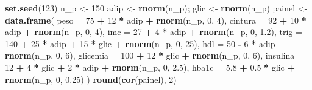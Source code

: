 \documentclass[
]{book}
\newenvironment{Shaded}{\begin{snugshade}}{\end{snugshade}}
\newcommand{\AttributeTok}[1]{\textcolor[rgb]{0.13,0.29,0.53}{#1}}
\newcommand{\DecValTok}[1]{\textcolor[rgb]{0.00,0.00,0.81}{#1}}
\newcommand{\FloatTok}[1]{\textcolor[rgb]{0.00,0.00,0.81}{#1}}
\newcommand{\FunctionTok}[1]{\textcolor[rgb]{0.13,0.29,0.53}{\textbf{#1}}}
\newcommand{\NormalTok}[1]{#1}
\newcommand{\OtherTok}[1]{\textcolor[rgb]{0.56,0.35,0.01}{#1}}
\newcommand{\SpecialCharTok}[1]{\textcolor[rgb]{0.81,0.36,0.00}{\textbf{#1}}}
\begin{document}
\begin{Shaded}
\begin{Highlighting}[]
\FunctionTok{set.seed}\NormalTok{(}\DecValTok{123}\NormalTok{)}
\NormalTok{n\_p }\OtherTok{\textless{}{-}} \DecValTok{150}
\NormalTok{adip }\OtherTok{\textless{}{-}} \FunctionTok{rnorm}\NormalTok{(n\_p); glic }\OtherTok{\textless{}{-}} \FunctionTok{rnorm}\NormalTok{(n\_p)}
\NormalTok{painel }\OtherTok{\textless{}{-}} \FunctionTok{data.frame}\NormalTok{(}
  \AttributeTok{peso    =} \DecValTok{75} \SpecialCharTok{+} \DecValTok{12} \SpecialCharTok{*}\NormalTok{ adip }\SpecialCharTok{+} \FunctionTok{rnorm}\NormalTok{(n\_p, }\DecValTok{0}\NormalTok{, }\DecValTok{4}\NormalTok{),}
  \AttributeTok{cintura =} \DecValTok{92} \SpecialCharTok{+} \DecValTok{10} \SpecialCharTok{*}\NormalTok{ adip }\SpecialCharTok{+} \FunctionTok{rnorm}\NormalTok{(n\_p, }\DecValTok{0}\NormalTok{, }\DecValTok{4}\NormalTok{),}
  \AttributeTok{imc     =} \DecValTok{27} \SpecialCharTok{+} \DecValTok{4} \SpecialCharTok{*}\NormalTok{ adip }\SpecialCharTok{+} \FunctionTok{rnorm}\NormalTok{(n\_p, }\DecValTok{0}\NormalTok{, }\FloatTok{1.2}\NormalTok{),}
  \AttributeTok{trig    =} \DecValTok{140} \SpecialCharTok{+} \DecValTok{25} \SpecialCharTok{*}\NormalTok{ adip }\SpecialCharTok{+} \DecValTok{15} \SpecialCharTok{*}\NormalTok{ glic }\SpecialCharTok{+} \FunctionTok{rnorm}\NormalTok{(n\_p, }\DecValTok{0}\NormalTok{, }\DecValTok{25}\NormalTok{),}
  \AttributeTok{hdl     =} \DecValTok{50} \SpecialCharTok{{-}} \DecValTok{6} \SpecialCharTok{*}\NormalTok{ adip }\SpecialCharTok{+} \FunctionTok{rnorm}\NormalTok{(n\_p, }\DecValTok{0}\NormalTok{, }\DecValTok{6}\NormalTok{),}
  \AttributeTok{glicemia =} \DecValTok{100} \SpecialCharTok{+} \DecValTok{12} \SpecialCharTok{*}\NormalTok{ glic }\SpecialCharTok{+} \FunctionTok{rnorm}\NormalTok{(n\_p, }\DecValTok{0}\NormalTok{, }\DecValTok{6}\NormalTok{),}
  \AttributeTok{insulina =} \DecValTok{12} \SpecialCharTok{+} \DecValTok{4} \SpecialCharTok{*}\NormalTok{ glic }\SpecialCharTok{+} \DecValTok{2} \SpecialCharTok{*}\NormalTok{ adip }\SpecialCharTok{+} \FunctionTok{rnorm}\NormalTok{(n\_p, }\DecValTok{0}\NormalTok{, }\FloatTok{2.5}\NormalTok{),}
  \AttributeTok{hba1c   =} \FloatTok{5.8} \SpecialCharTok{+} \FloatTok{0.5} \SpecialCharTok{*}\NormalTok{ glic }\SpecialCharTok{+} \FunctionTok{rnorm}\NormalTok{(n\_p, }\DecValTok{0}\NormalTok{, }\FloatTok{0.25}\NormalTok{)}
\NormalTok{)}
\FunctionTok{round}\NormalTok{(}\FunctionTok{cor}\NormalTok{(painel), }\DecValTok{2}\NormalTok{)}
\end{Highlighting}
\end{Shaded}
\end{document}
